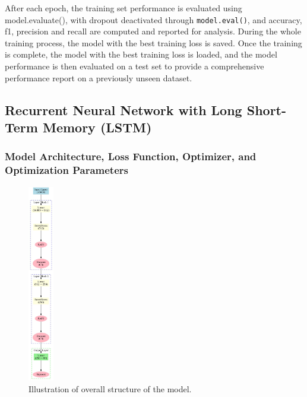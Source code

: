 \documentclass{article}
\begin{document}
After each epoch, the training set performance is evaluated using model.evaluate(), with dropout deactivated through \texttt{model.eval()}, and accuracy, f1, precision and recall are computed and reported for analysis. During the whole training process, the model with the best training loss is saved. Once the training is complete, the model with the best training loss is loaded, and the model performance is then evaluated on a test set to provide a comprehensive performance report on a previously unseen dataset.
\subsection{Recurrent Neural Network with Long Short-Term Memory (LSTM)}
\subsubsection{Model Architecture, Loss Function, Optimizer, and Optimization Parameters}

\begin{figure}[h!]
  \centering
  \includegraphics[width=0.1\textwidth]{LSTM.png} 
  \caption{Illustration of overall structure of the model.}
  \label{fig:your-label}
\end{figure}
\end{document}
